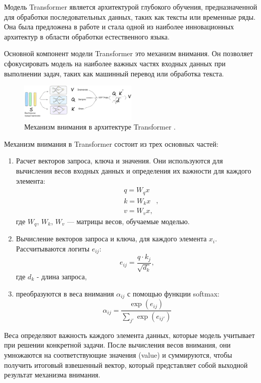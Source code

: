 Модель Transformer является архитектурой глубокого обучения, предназначенной для обработки последовательных данных,
таких как тексты или временные ряды. 
Она была предложена в работе \cite{vaswani2017attention} и стала одной из наиболее инновационных архитектур
в области обработки естественного языка.

Основной компонент модели Transformer это механизм внимания. Он позволяет сфокусировать модель
на наиболее важных частях входных данных при выполнении задач, таких как машинный перевод или обработка текста.

\begin{figure}[h]
    \centering
    \includegraphics[width=0.5\textwidth]{assets/ml/nn/transformer.excalidraw.png}
    \caption{Механизм внимания в архитектуре Transformer \cite{vaswani2017attention}. }
    \label{attention}
\end{figure}

Механизм внимания в Transformer состоит из трех основных частей:\begin{enumerate}
    \item  Расчет векторов запроса, ключа и значения.
    Они используются для вычисления весов входных данных и определения их важности для каждого элемента:
    \begin{equation}
        \begin{aligned}
            &q =W_q x \\ 
            &k = W_k x \\
            &v = W_v x,
        \end{aligned},
    \end{equation}
    где \(W_q\), \(W_k\), \(W_v\) --- матрицы весов, обучаемые моделью.
    \item Вычисление векторов запроса и ключа, для каждого элемента \(x_i\). Рассчитываются логиты \(e_{ij}\):
    \begin{equation}
        e_{ij} = \frac{q \cdot k_j}{\sqrt{d_k}},
    \end{equation}
    где \(d_k\) - длина запроса,
    \item преобразуются в веса внимания \( \alpha_{ij} \) с помощью функции softmax:
    \begin{equation}
        \alpha_{ij} = \frac{\exp(e_{ij})}{\sum_{j'} \exp(e_{ij'})}
    \end{equation}
\end{enumerate}

Веса определяют важность каждого элемента данных, которые модель учитывает при решении конкретной задачи. 
После вычисления весов внимания, они умножаются на соответствующие значения (value) и суммируются, 
чтобы получить итоговый взвешенный вектор, который представляет собой выходной результат механизма внимания.